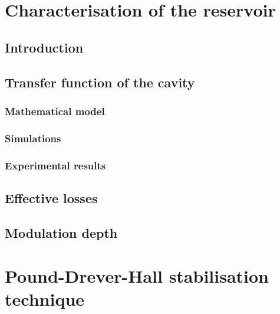 

\section{Characterisation of the reservoir}


\subsection{Introduction}


\subsection{Transfer function of the cavity}


\subsubsection{Mathematical model}


\subsubsection{Simulations}


\subsubsection{Experimental results}


\subsection{Effective losses}


\subsection{Modulation depth}


\section{Pound-Drever-Hall stabilisation technique}


